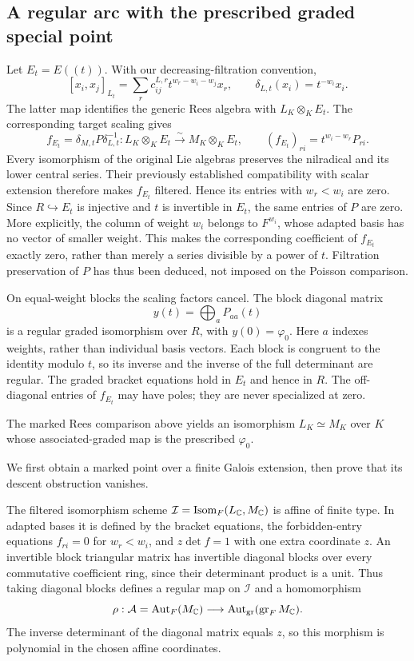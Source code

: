 \subsection{A regular arc with the prescribed graded special point}

Let $E_t=E((t))$. With our decreasing-filtration convention,
\[
 [x_i,x_j]_{L_t}=\sum_r c^{L,r}_{ij}
                   t^{w_r-w_i-w_j}x_r,\qquad
 \delta_{L,t}(x_i)=t^{-w_i}x_i.
\]
The latter map identifies the generic Rees algebra with
$L_K\otimes_K E_t$. The corresponding target scaling gives
\[
 f_{E_t}=\delta_{M,t}P\delta_{L,t}^{-1}:
 L_K\otimes_K E_t\xrightarrow{\sim}
 M_K\otimes_K E_t,
 \qquad (f_{E_t})_{ri}=t^{w_i-w_r}P_{ri}.
\]
Every isomorphism of the original Lie algebras preserves the nilradical
and its lower central series. Their previously established compatibility
with scalar extension therefore makes $f_{E_t}$ filtered. Hence its entries
with $w_r<w_i$ are zero. Since $R\hookrightarrow E_t$ is injective and
$t$ is invertible in $E_t$, the same entries of $P$ are zero. More explicitly, the column of weight
$w_i$ belongs to $F^{w_i}$, whose adapted basis has no vector of smaller
weight. This makes the corresponding coefficient of $f_{E_t}$ exactly
zero, rather than merely a series divisible by a power of $t$. Filtration
preservation of $P$ has thus been deduced, not imposed on the Poisson
comparison.

On equal-weight blocks the scaling factors cancel. The block diagonal
matrix
\[
 y(t)=\bigoplus_a P_{aa}(t)
\]
is a regular graded isomorphism over $R$, with $y(0)=\varphi_0$.
Here $a$ indexes weights, rather than individual basis vectors. Each block
is congruent to the identity modulo $t$, so its inverse and the inverse
of the full determinant are regular. The graded bracket equations hold
in $E_t$ and hence in $R$. The off-diagonal entries of $f_{E_t}$ may have poles;
they are never specialized at zero.

\begin{proposition}\label{prop:marked-descent}
The marked Rees comparison above yields an isomorphism
$L_K\simeq M_K$ over $K$ whose associated-graded map
is the prescribed $\varphi_0$.
\end{proposition}

We first obtain a marked point over a finite Galois extension, then prove
that its descent obstruction vanishes.

The filtered isomorphism scheme
$\mathcal I=\operatorname{Isom}_F(L_{\mathbb C},M_{\mathbb C})$ is affine of
finite type. In adapted bases it is defined by the bracket equations,
the forbidden-entry equations $f_{ri}=0$ for $w_r<w_i$, and
$z\det f=1$ with one extra coordinate $z$. An invertible block triangular
matrix has invertible diagonal blocks over every commutative coefficient
ring, since their determinant product is a unit. Thus taking diagonal
blocks defines a regular map on $\mathcal I$ and a homomorphism
\[
 \rho:\mathcal A=\operatorname{Aut}_F(M_{\mathbb C})
       \longrightarrow\operatorname{Aut}_{\operatorname{gr}}(\operatorname{gr}_FM_{\mathbb C}).
\]
The inverse determinant of the diagonal matrix equals $z$, so this
morphism is polynomial in the chosen affine coordinates.

